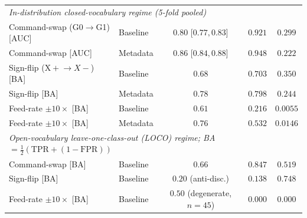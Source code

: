 \documentclass[sensors,article,submit,moreauthors,pdftex]{Definitions/mdpi}
\begin{document}
\begin{table}[ht]
\begin{tabular}{l l c c c}
\midrule
\multicolumn{5}{l}{\emph{In-distribution closed-vocabulary regime (5-fold pooled)}} \\
Command-swap (G0$\to$G1) [AUC]   & Baseline & $0.80$ \tiny{[$0.77, 0.83$]} & $0.921$ & $0.299$ \\
Command-swap [AUC]               & Metadata  & $0.86$ \tiny{[$0.84, 0.88$]} & $0.948$ & $0.222$ \\
Sign-flip (X$\!+\!\to\!X-$) [BA] & Baseline & $0.68$ & $0.703$ & $0.350$ \\
Sign-flip [BA]                   & Metadata  & $0.78$ & $0.798$ & $0.244$ \\
Feed-rate $\pm 10\times$ [BA]    & Baseline & $0.61$ & $0.216$ & $0.0055$ \\
Feed-rate $\pm 10\times$ [BA]    & Metadata  & $0.76$ & $0.532$ & $0.0146$ \\
\midrule
\multicolumn{5}{l}{\emph{Open-vocabulary leave-one-class-out (LOCO) regime; BA$\!=\!\tfrac{1}{2}(\mathrm{TPR}+(1-\mathrm{FPR}))$}} \\
Command-swap [BA]                & Baseline & $0.66$ & $0.847$ & $0.519$ \\
Sign-flip [BA]                   & Baseline & $0.20$ \tiny{(anti-disc.)} & $0.138$ & $0.748$ \\
Feed-rate $\pm 10\times$ [BA]    & Baseline & $0.50$ \tiny{(degenerate, $n\!=\!45$)} & $0.000$ & $0.000$ \\
\bottomrule
\end{tabular}
\end{table}
\end{document}
